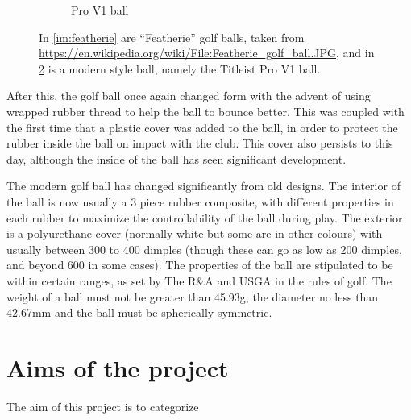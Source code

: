 \begin{figure}[h]
\begin{subfigure}[b]{0.4\textwidth}
\caption{Pro V1 ball}
\label{im:pv1}
\end{subfigure}
\caption[Images of golf balls]{In \ref{im:featherie} are ``Featherie'' golf balls, taken from 
\url{https://en.wikipedia.org/wiki/File:Featherie_golf_ball.JPG}, 
and in \ref{im:pv1} is a modern style ball, namely the Titleist Pro V1 ball.}
\end{figure}

After this, the golf ball once again changed form with the advent of using wrapped rubber
thread to help the ball to bounce better. This was coupled with the first time that a plastic
cover was added to the ball, in order to protect the rubber inside the ball on impact with the
club. This cover also persists to this day, although the inside of the ball has seen significant
development.

The modern golf ball has changed significantly from old designs. The interior of the ball is
now usually a 3 piece rubber composite, with different properties in each rubber to maximize
the controllability of the ball during play. The exterior is a polyurethane cover (normally white
but some are in other colours) with usually between 300 to 400 dimples (though these can go as 
low as 200 dimples, and beyond 600 in some cases). The properties of the ball are stipulated to be
within certain ranges, as set by The R\&A and USGA in the rules of golf. The weight of a ball must
not be greater than 45.93g, the diameter no less than 42.67mm and the ball must be spherically symmetric.

\section{Aims of the project}

The aim of this project is to categorize 